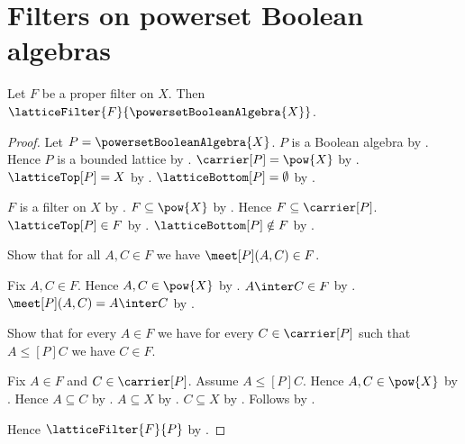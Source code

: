 \section{Filters on powerset Boolean algebras}





\begin{proposition}\label{proper_filter_is_lattice_filter_on_powerset_boolean_algebra}
    Let $F$ be a proper filter on $X$. Then
        $\latticeFilter{F}{\powersetBooleanAlgebra{X}}$.
\end{proposition}
\begin{proof}
    Let $P=\powersetBooleanAlgebra{X}$.
    $P$ is a Boolean algebra by
        .
    Hence $P$ is a bounded lattice by
        .
    $\carrier[P]=\pow{X}$ by
        .
    $\latticeTop[P]=X$ by
        .
    $\latticeBottom[P]=\emptyset$ by
        .

    $F$ is a filter on $X$ by .
    $F\subseteq\pow{X}$ by
        .
    Hence $F\subseteq\carrier[P]$.
    $\latticeTop[P]\in F$ by .
    $\latticeBottom[P]\notin F$ by .

    Show that for all $A,C\in F$ we have
        $\meet[P](A,C)\in F$.
    \begin{subproof}
        Fix $A,C\in F$.
        Hence $A,C\in\pow{X}$ by .
        $A\inter C\in F$ by .
        $\meet[P](A,C)=A\inter C$ by
            .
    \end{subproof}

    Show that for every $A\in F$ we have
        for every $C\in\carrier[P]$ such that
            $A\mathrel{\leq[P]}C$ we have $C\in F$.
    \begin{subproof}
        Fix $A\in F$ and $C\in\carrier[P]$.
        Assume $A\mathrel{\leq[P]}C$.
        Hence $A,C\in\pow{X}$ by .
        Hence $A\subseteq C$ by
            .
        $A\subseteq X$ by .
        $C\subseteq X$ by .
        Follows by .
    \end{subproof}
    Hence $\latticeFilter{F}{P}$ by .
\end{proof}

